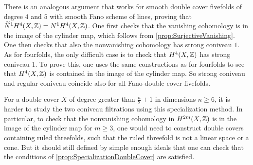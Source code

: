 \begin{remark}
	There is an analogous argument that works for smooth double cover fivefolds of degree $4$ and $5$ with smooth Fano scheme of lines, proving that $\widetilde{N}^1H^4(X,\mathbb{Z}) = N^1H^4(X,\mathbb{Z})$. One first checks that the vanishing cohomology  is in the image of the cylinder map, which follows from \cref{prop:SurjectiveVanishing}. One then checks that also the nonvanishing cohomology has strong coniveau $1$. As for fourfolds, the only difficult case is to check that $H^4(X,\mathbb{Z})$ has strong coniveau 1. To prove this, one uses the same constructions as for fourfolds to see that $H^4(X,\mathbb{Z})$ is contained in the image of the cylinder map. So strong coniveau and regular coniveau coincide also for all Fano double cover fivefolds.
\end{remark}

\begin{remark}
	 For a double cover $X$ of degree greater than $\frac{n}{2}+1$ in dimensions $n \geq 6$, it is harder to study the two coniveau filtrations using this specialization method. In particular, to check that the nonvanishing cohomology in $H^{2m}(X,\mathbb{Z})$ is in the image of the cylinder map for $m \geq 3$, one would need to construct double covers containing ruled threefolds, such that the ruled threefold is not a linear space or a cone. But it should still defined by simple enough ideals that one can check that the conditions of \cref{prop:SpecializationDoubleCover} are satisfied.
\end{remark}

\printbibliography[heading = subbibliography]
\stopcontents[chapters]